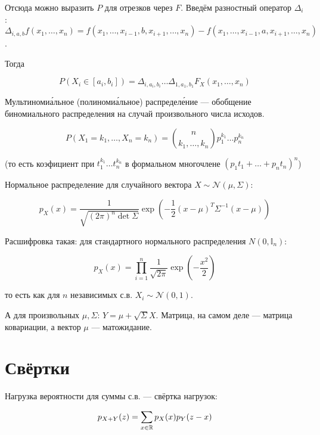\documentclass[12pt, a4paper, oneside]{article}
\begin{document}
Отсюда можно выразить $P$ для отрезков через $F$.
Введём разностный оператор $\Delta_i$: $\Delta_{i, a, b} f(x_1, \ldots, x_n) = f(x_1, \ldots, x_{i - 1}, b, x_{i + 1}, \ldots, x_n) - f(x_1, \ldots, x_{i - 1}, a, x_{i + 1}, \ldots, x_n)$.

Тогда 

\begin{equation}
    P(X_i \in [a_i, b_i]) = \Delta_{i, a_i, b_i} \ldots \Delta_{1, a_1, b_1} F_X(x_1, \ldots, x_n)
\end{equation}

Мультиномиа́льное (полиномиа́льное) распределе́ние — обобщение биномиального распределения на случай произвольного числа исходов.

\begin{equation}
    P(X_1 = k_1, \ldots, X_n = k_n) = {n \choose k_1, \ldots, k_n} p_1^{k_1} \ldots p_n^{k_n}
\end{equation}

(то есть коэфициент при $t_1^{k_1} \ldots t_n^{k_n}$ в формальном многочлене $(p_1 t_1 + \ldots + p_n t_n)^n$)

Нормальное распределение для случайного вектора $X \sim \mathcal{N}(\mu, \Sigma)$:

\begin{equation}
    p_X(x) = \frac{1}{\sqrt{(2 \pi)^n \det \Sigma}} \exp \left( - \frac{1}{2} (x - \mu)^T \Sigma^{-1} (x - \mu) \right)
\end{equation}

Расшифровка такая: для стандартного нормального распределения $N(0, \mathbb{I}_n)$:

\begin{equation}
    p_X(x) = \prod_{i=1}^{n} \frac{1}{\sqrt{2 \pi}} \exp \left( - \frac{x^2}{2} \right)    
\end{equation}

то есть как для $n$ независимых с.в. $X_i \sim \mathcal{N}(0, 1)$.

А для произвольных $\mu, \Sigma$: $Y = \mu + \sqrt{\Sigma} X$. Матрица, на самом деле — матрица ковариации, а вектор $\mu$ — матожидание.



\section{Свёртки}


Нагрузка вероятности для суммы с.в. — свёртка нагрузок:

\begin{equation}
    p_{X + Y}(z) = \sum_{x \in {\mathbb{R}}} p_X(x) p_Y(z - x)
\end{equation}
\end{document}
